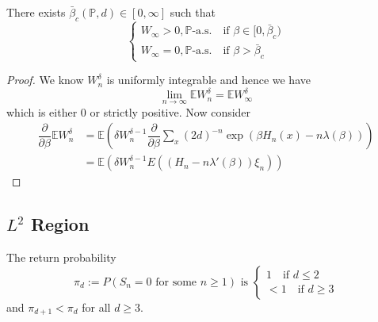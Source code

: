 \begin{proposition}
    There exists $\bar{\beta}_c(\mathbb{P},d) \in [0,\infty]$ such that
    \[
    \begin{cases}
        W_{\infty} > 0, \mathbb{P}\text{-a.s.}\quad\text{if }\beta\in[0,\bar{\beta}_c) \\
        W_{\infty} = 0, \mathbb{P}\text{-a.s.}\quad\text{if }\beta>\bar{\beta}_c
    \end{cases}
    \]
\end{proposition}
\begin{proof}
    We know $W_n^{\delta}$ is uniformly integrable and hence we have
    \[
    \lim\limits_{n\to\infty} \mathbb{E}W_n^{\delta} = \mathbb{E}W_{\infty}^{\delta}
    \]
    which is either $0$ or strictly positive. Now consider
    \[
    \begin{aligned}
        \dfrac{\partial}{\partial \beta} \mathbb{E}W_{n}^{\delta} & = \mathbb{E}(\delta W_n^{\delta-1} \dfrac{\partial}{\partial \beta} \sum\limits_{x} (2d)^{-n} \exp{(\beta H_n(x) - n\lambda(\beta))})\\
        & = \mathbb{E}(\delta W_n^{\delta-1}E((H_n-n\lambda'(\beta))\xi_n))
    \end{aligned}
    \]
\end{proof}

\subsection{$L^2$ Region}

\begin{proposition}
    The return probability
    \[\pi_d:= P(S_n = 0\text{ for some }n\geq 1) \text{ is } \begin{cases}
        1\quad\text{if }d\leq 2 \\ <1\quad\text{if }d\geq 3
    \end{cases}\]
    and $\pi_{d+1} < \pi_d$ for all $d\geq 3$.
\end{proposition}

